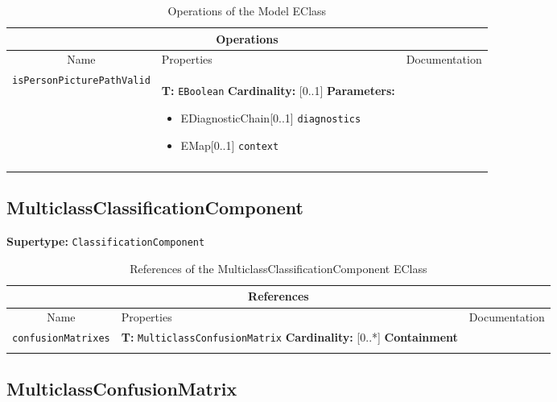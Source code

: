 \documentclass{article}
\begin{document}
\begin{table}[H]
\footnotesize
\begin{tabularx}{\textwidth}{|c| p{4 cm} | X |}
\hline
\multicolumn{3}{|c|}{\textbf{Operations}} \\
\hline
Name & Properties & Documentation \\ \hline \hline
\texttt{isPersonPicturePathValid}
 & 
\textbf{T:} \texttt{EBoolean}
\newline
\textbf{Cardinality:} [0..1]
\newline
\textbf{Parameters:}
\begin{itemize}
\item EDiagnosticChain[0..1] \texttt{diagnostics}
\item EMap[0..1] \texttt{context}
\end{itemize}
 & \\ \hline
\caption{Operations of the Model EClass}
\end{tabularx}
\label{e4smModelop}
\end{table}
\subsection[MulticlassClassificationComponent]{MulticlassClassificationComponent}
\label{e4smMulticlassClassificationComponent}

\textbf{Supertype: }\texttt{ClassificationComponent}
\begin{table}[H]
\footnotesize
\begin{tabularx}{\textwidth}{|c| p{4 cm} | X |}
\hline
\multicolumn{3}{|c|}{\textbf{References}} \\
\hline
Name & Properties & Documentation \\ \hline \hline
\texttt{confusionMatrixes}
 & 
\textbf{T:} \texttt{MulticlassConfusionMatrix}
\newline
\textbf{Cardinality:} [0..*]
\newline
\textbf{Containment}
 & \\ \hline
\caption{References of the MulticlassClassificationComponent EClass}
\end{tabularx}
\label{e4smMulticlassClassificationComponentref}
\end{table}
\subsection[MulticlassConfusionMatrix]{MulticlassConfusionMatrix}
\label{e4smMulticlassConfusionMatrix}
\end{document}
